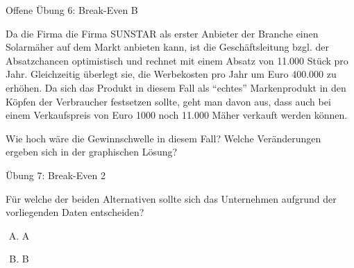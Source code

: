 \documentclass[12pt,ngerman,a4paper,ignorenonframetext,]{beamer}
\providecommand{\tightlist}{%
  \setlength{\itemsep}{0pt}\setlength{\parskip}{0pt}}
\begin{document}
\begin{frame}{Offene Übung 6: Break-Even B}
\protect\hypertarget{offene-ubung-6-break-even-b}{}

Da die Firma die Firma SUNSTAR als erster Anbieter der Branche einen
Solarmäher auf dem Markt anbieten kann, ist die Geschäftsleitung bzgl.
der Absatzchancen optimistisch und rechnet mit einem Absatz von 11.000
Stück pro Jahr. Gleichzeitig überlegt sie, die Werbekosten pro Jahr um
Euro 400.000 zu erhöhen. Da sich das Produkt in diesem Fall als
``echtes'' Markenprodukt in den Köpfen der Verbraucher festsetzen
sollte, geht man davon aus, dass auch bei einem Verkaufspreis von Euro
1000 noch 11.000 Mäher verkauft werden können.

Wie hoch wäre die Gewinnschwelle in diesem Fall? Welche Veränderungen
ergeben sich in der graphischen Lösung?


\end{frame}

\begin{frame}{Übung 7: Break-Even 2}
\protect\hypertarget{ubung-7-break-even-2}{}

Für welche der beiden Alternativen sollte sich das Unternehmen aufgrund
der vorliegenden Daten entscheiden?

\begin{enumerate}
[A.]
\tightlist
\item
  A
\item
  B
\end{enumerate}


\end{frame}
\end{document}
